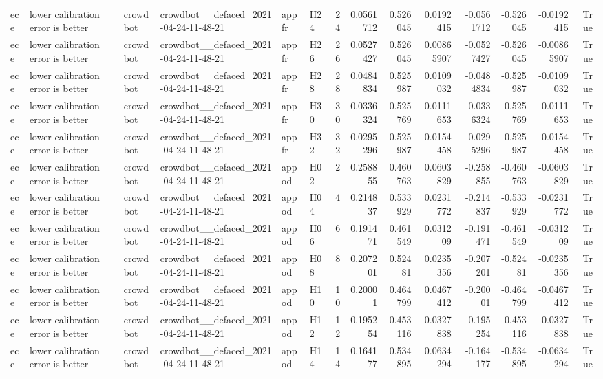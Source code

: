 \begin{longtable}{llllllrrrrrrrr}
ece & lower calibration error is better & crowdbot & crowdbot\_\_defaced\_2021-04-24-11-48-21 & appfr & H24 & 24 & 0.0561712 & 0.526045 & 0.0192415 & -0.0561712 & -0.526045 & -0.0192415 & True \\
ece & lower calibration error is better & crowdbot & crowdbot\_\_defaced\_2021-04-24-11-48-21 & appfr & H26 & 26 & 0.0527427 & 0.526045 & 0.00865907 & -0.0527427 & -0.526045 & -0.00865907 & True \\
ece & lower calibration error is better & crowdbot & crowdbot\_\_defaced\_2021-04-24-11-48-21 & appfr & H28 & 28 & 0.0484834 & 0.525987 & 0.0109032 & -0.0484834 & -0.525987 & -0.0109032 & True \\
ece & lower calibration error is better & crowdbot & crowdbot\_\_defaced\_2021-04-24-11-48-21 & appfr & H30 & 30 & 0.0336324 & 0.525769 & 0.0111653 & -0.0336324 & -0.525769 & -0.0111653 & True \\
ece & lower calibration error is better & crowdbot & crowdbot\_\_defaced\_2021-04-24-11-48-21 & appfr & H32 & 32 & 0.0295296 & 0.525987 & 0.0154458 & -0.0295296 & -0.525987 & -0.0154458 & True \\
ece & lower calibration error is better & crowdbot & crowdbot\_\_defaced\_2021-04-24-11-48-21 & appod & H02 & 2 & 0.258855 & 0.460763 & 0.0603829 & -0.258855 & -0.460763 & -0.0603829 & True \\
ece & lower calibration error is better & crowdbot & crowdbot\_\_defaced\_2021-04-24-11-48-21 & appod & H04 & 4 & 0.214837 & 0.533929 & 0.0231772 & -0.214837 & -0.533929 & -0.0231772 & True \\
ece & lower calibration error is better & crowdbot & crowdbot\_\_defaced\_2021-04-24-11-48-21 & appod & H06 & 6 & 0.191471 & 0.461549 & 0.031209 & -0.191471 & -0.461549 & -0.031209 & True \\
ece & lower calibration error is better & crowdbot & crowdbot\_\_defaced\_2021-04-24-11-48-21 & appod & H08 & 8 & 0.207201 & 0.52481 & 0.0235356 & -0.207201 & -0.52481 & -0.0235356 & True \\
ece & lower calibration error is better & crowdbot & crowdbot\_\_defaced\_2021-04-24-11-48-21 & appod & H10 & 10 & 0.20001 & 0.464799 & 0.0467412 & -0.20001 & -0.464799 & -0.0467412 & True \\
ece & lower calibration error is better & crowdbot & crowdbot\_\_defaced\_2021-04-24-11-48-21 & appod & H12 & 12 & 0.195254 & 0.453116 & 0.0327838 & -0.195254 & -0.453116 & -0.0327838 & True \\
ece & lower calibration error is better & crowdbot & crowdbot\_\_defaced\_2021-04-24-11-48-21 & appod & H14 & 14 & 0.164177 & 0.534895 & 0.0634294 & -0.164177 & -0.534895 & -0.0634294 & True \\

\end{longtable}
